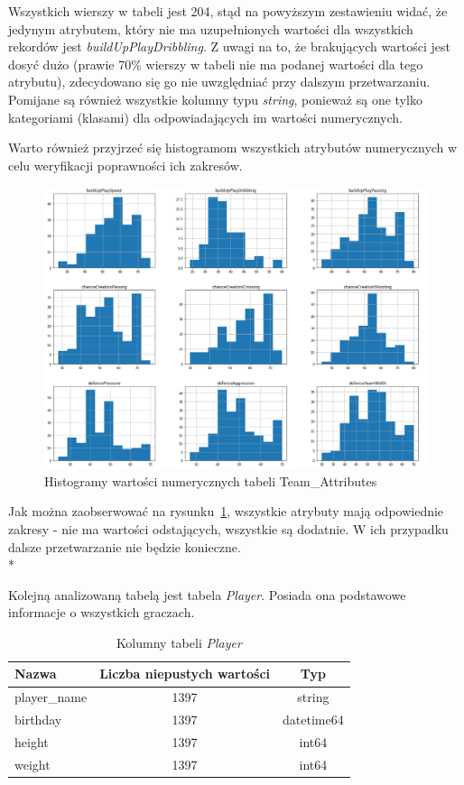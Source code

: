     \noindent Wszystkich wierszy w tabeli jest 204, stąd na powyższym zestawieniu widać, że jedynym atrybutem, który nie ma uzupełnionych wartości dla wszystkich rekordów jest \emph{buildUpPlayDribbling}. Z uwagi na to, że brakujących wartości jest dosyć dużo (prawie 70\% wierszy w tabeli nie ma podanej wartości dla tego atrybutu), zdecydowano się go nie uwzględniać przy dalszym przetwarzaniu. Pomijane są również wszystkie kolumny typu \emph{string}, ponieważ są one tylko kategoriami (klasami) dla odpowiadających im wartości numerycznych.
    
    Warto również przyjrzeć się histogramom wszystkich atrybutów numerycznych w celu weryfikacji poprawności ich zakresów.
    
    \begin{figure}[H] 
        \centering\includegraphics[width=\textwidth]{figures/team_attributes.png}
        \caption{Histogramy wartości numerycznych tabeli Team\_Attributes}
        \label{fig:team_attributes}
    \end{figure}
    
    \noindent Jak można zaobserwować na rysunku~\ref{fig:team_attributes}, wszystkie atrybuty mają odpowiednie zakresy - nie ma wartości odstających, wszystkie są dodatnie. W ich przypadku dalsze przetwarzanie nie będzie konieczne.\\*
    
    \noindent Kolejną analizowaną tabelą jest tabela \emph{Player}. Posiada ona podstawowe informacje o wszystkich graczach.
    
    \begin{table}[H]
    \caption{Kolumny tabeli \emph{Player}}\label{tab:player}
    \centering\footnotesize%
    \begin{tabular}{l c c}
    \toprule
        Nazwa & Liczba niepustych wartości & Typ \\
    \midrule
        player\_name & 1397 & string \\
        birthday & 1397 & datetime64 \\
        height & 1397 & int64 \\
        weight & 1397 & int64 \\
    \bottomrule
    \end{tabular}
    \end{table}
    
